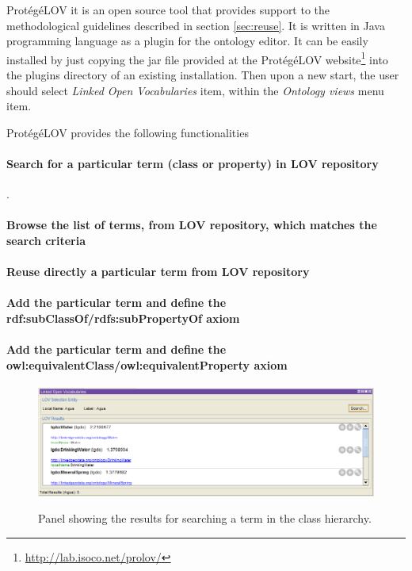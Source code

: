 Prot{\'e}g{\'e}LOV it is an open source tool that provides support to the methodological guidelines described in section \ref{sec:reuse}. It is written in Java programming language as a plugin for the \protege ontology editor. It can be easily installed by just copying the jar file provided at the Prot{\'e}g{\'e}LOV website\footnote{\url{http://lab.isoco.net/prolov/}} into the plugins directory of an existing \protege installation. Then upon a new start, the user should select \emph{Linked Open Vocabularies} item, within the \emph{Ontology views} menu item.

Prot{\'e}g{\'e}LOV provides the following functionalities 

\paragraph{Search for a particular term (class or property) in LOV repository}. %

\paragraph{Browse the list of terms, from LOV repository, which matches the search criteria}

\paragraph{Reuse directly a particular term from LOV repository}

\paragraph{Add the particular term and define the rdf:subClassOf/rdfs:subPropertyOf axiom}

\paragraph{Add the particular term and define the owl:equivalentClass/owl:equivalentProperty axiom}


\begin{figure}[!bht]
\center
\includegraphics[scale=0.5]{img/LOVmockup.png}
\label{fig:LOVresults}
\caption{Panel showing the results for searching a term in the class hierarchy.}
\end{figure}


